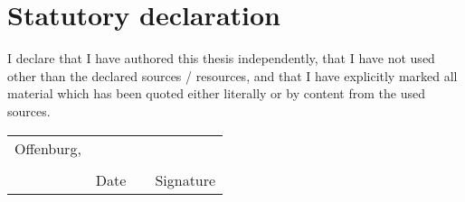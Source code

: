 \section*{Statutory declaration}

\foreignlanguage{american}{
	I declare that I have authored this thesis independently, that I have not used other than the declared
	sources / resources, and that I have explicitly marked all material which has been quoted either literally or by content from the used sources. }


\newcommand{\mysignatureblock}[3]{%
	\begin{tabular}{llp{2em}l} 
		#1 & \hspace{4cm}        & & \hspace{4cm} \\\cline{2-2}\cline{4-4}
		&                     & & \\[-3mm]
		& {\footnotesize #2}  & & {\footnotesize #3}
	\end{tabular}
}

\mysignatureblock{Offenburg,}{Date}{Signature}



